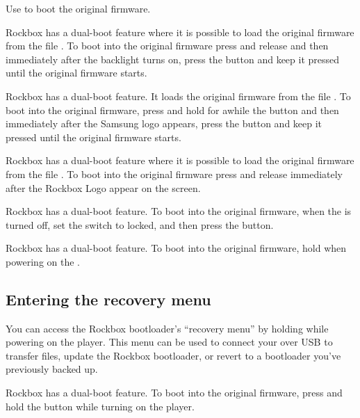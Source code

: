 {  
    {
    Use \ButtonPower{} to boot the original \playerman{} firmware.
    }

    {
    Rockbox has a dual-boot feature where it is possible to load the original firmware from
    the file . To boot into the original firmware press and release
    \ButtonPower{} and then immediately after the backlight turns on, press the \ButtonOK{}
    button and keep it pressed until the original firmware starts.
    }

    {
    Rockbox has a dual-boot feature. It loads the original firmware from
    the file . To boot into the original firmware, press and hold
    for awhile the \ButtonPlay{} button and then immediately after the Samsung logo appears,
    press the \ButtonLeft{} button and keep it pressed until the original firmware starts.
    }

    {
    Rockbox has a dual-boot feature where it is possible to load the original firmware from
    the file . To boot into the original firmware press and release
    \ButtonPower{} immediately after the Rockbox Logo appear on the screen.
    }

    {
    Rockbox has a dual-boot feature. To boot into the original firmware,
    when the \dap{} is turned off, set the \ButtonLock{} switch to locked,
    and then press the \ButtonPower{} button.
    }

    {
    Rockbox has a dual-boot feature. To boot into the original firmware,
    hold \ActionBootOFPlayer{} when powering on the \dap{}.


    \subsection{Entering the recovery menu}
    You can access the Rockbox bootloader's ``recovery menu'' by holding
    \ActionBootRecoveryMenu{} while powering on the player. This menu can be
    used to connect your \dap{} over USB to transfer files, update the Rockbox
    bootloader, or revert to a bootloader you've previously backed up.
    }

    {
    Rockbox has a dual-boot feature. To boot into the original firmware,
    press and hold the \ButtonBack{} button while turning on the player.

    }

  }

